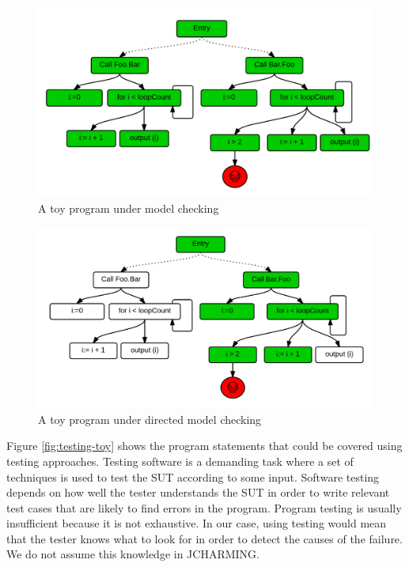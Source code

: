 \documentclass[times, doublespace]{smrauth}
\begin{document}
\begin{figure}
  \centering
    \includegraphics[scale=0.7]{media/mc.png}
    \caption{A toy program under model checking
    \label{fig:checking-toy}}
\end{figure}

\begin{figure}
  \centering
    \includegraphics[scale=0.7]{media/dmc.png}
    \caption{A toy program under directed model checking
    \label{fig:dchecking-toy}}
\end{figure}

Figure \ref{fig:testing-toy} shows the program statements that could be covered using testing approaches. Testing software is a demanding task where a set of techniques is used to test the SUT according to some input. Software testing depends on how well the tester understands the SUT in order to write relevant test cases that are likely to find errors in the program. Program testing is usually insufficient because it is not exhaustive. In our case, using testing would mean that the tester knows what to look for in order to detect the causes of the failure. We do not assume this knowledge in JCHARMING.
\end{document}
